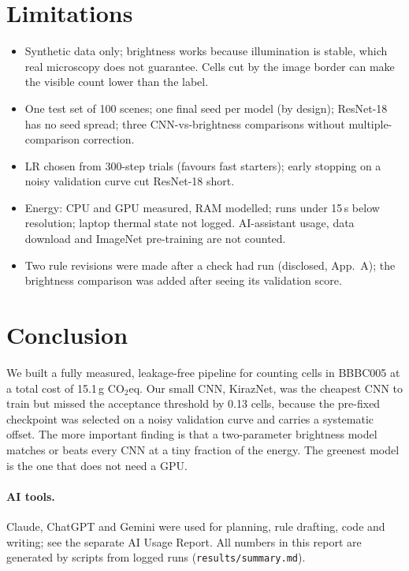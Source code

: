 \documentclass[11pt,a4paper]{article}
\newcommand{\kn}{KirazNet}
\begin{document}
\section{Limitations}
\begin{itemize}\setlength\itemsep{1pt}
\item Synthetic data only; brightness works because illumination is stable, which real microscopy does not
guarantee. Cells cut by the image border can make the visible count lower than the label.
\item One test set of 100 scenes; one final seed per model (by design); ResNet-18 has no seed spread; three
CNN-vs-brightness comparisons without multiple-comparison correction.
\item LR chosen from 300-step trials (favours fast starters); early stopping on a noisy validation curve
cut ResNet-18 short.
\item Energy: CPU and GPU measured, RAM modelled; runs under 15\,s below resolution; laptop thermal state
not logged. AI-assistant usage, data download and ImageNet pre-training are not counted.
\item Two rule revisions were made after a check had run (disclosed, App.~A); the brightness comparison was
added after seeing its validation score.
\end{itemize}

\section{Conclusion}
We built a fully measured, leakage-free pipeline for counting cells in BBBC005 at a total cost of
15.1\,g CO$_2$eq. Our small CNN, \kn{}, was the cheapest CNN to train but missed the acceptance threshold
by 0.13 cells, because the pre-fixed checkpoint was selected on a noisy validation curve and carries a
systematic offset. The more important finding is that a two-parameter brightness model matches or beats
every CNN at a tiny fraction of the energy. The greenest model is the one that does not need a GPU.

\paragraph{AI tools.} Claude, ChatGPT and Gemini were used for planning, rule drafting, code and writing;
see the separate AI Usage Report. All numbers in this report are generated by scripts from logged runs
(\texttt{results/summary.md}).
\end{document}
